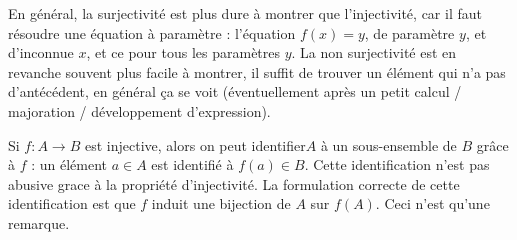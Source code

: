 En général, la surjectivité est plus dure à montrer que l'injectivité, car il faut résoudre une équation à paramètre : l'équation $f(x)=y$, de paramètre $y$, et d'inconnue $x$, et ce pour tous les paramètres $y$. La non surjectivité est en revanche souvent plus facile à montrer, il suffit de trouver un élément qui n'a pas d'antécédent, en général ça se voit (éventuellement après un petit calcul / majoration / développement d'expression).
\begin{remarque} Si $f : A\to B$ est injective, alors on peut \og identifier\fg $A$ à un sous-ensemble de $B$ grâce à $f$ : un élément $a \in A$ est identifié à $f(a) \in B$. Cette identification n'est pas abusive grace à la propriété d'injectivité. La formulation correcte de cette identification est que $f$ induit une bijection de $A$ sur $f(A)$. Ceci n'est qu'une remarque.\end{remarque}

\begin{definition}\end{definition}

